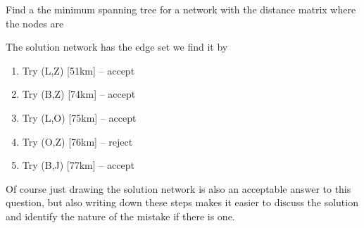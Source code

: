 



Find a the minimum spanning tree for a network with the distance matrix 
where the nodes are 


\solution
The solution network has the edge set 
we find it by
\begin{enumerate}[label=\arabic*.]
    \item Try (L,Z) [51km] -- accept
    \item Try (B,Z) [74km] -- accept
    \item Try (L,O) [75km] -- accept
    \item Try (O,Z) [76km] -- reject
    \item Try (B,J) [77km] -- accept 
\end{enumerate}
Of course just drawing the solution network is also an acceptable answer to this question, but also writing down these steps makes it easier to discuss the solution and identify the nature of the mistake if there is one.  

